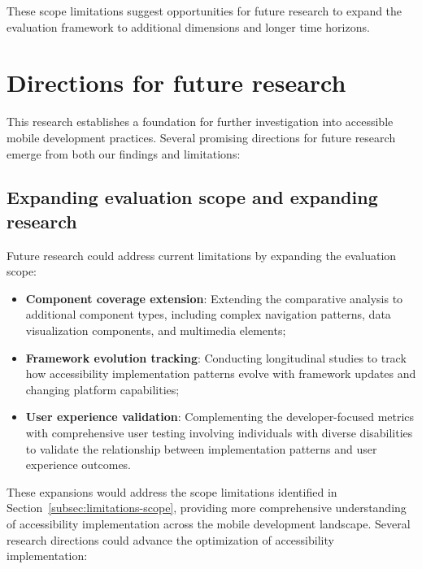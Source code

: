 These scope limitations suggest opportunities for future research to expand the evaluation framework to additional dimensions and longer time horizons.

\section{Directions for future research}
\label{sec:future-research}

This research establishes a foundation for further investigation into accessible mobile development practices. Several promising directions for future research emerge from both our findings and limitations:

\subsection{Expanding evaluation scope and expanding research}
\label{subsec:future-expand}

Future research could address current limitations by expanding the evaluation scope:

\begin{itemize}
    \item \textbf{Component coverage extension}: Extending the comparative analysis to additional component types, including complex navigation patterns, data visualization components, and multimedia elements;

    \item \textbf{Framework evolution tracking}: Conducting longitudinal studies to track how accessibility implementation patterns evolve with framework updates and changing platform capabilities;

    \item \textbf{User experience validation}: Complementing the developer-focused metrics with comprehensive user testing involving individuals with diverse disabilities to validate the relationship between implementation patterns and user experience outcomes.
\end{itemize}

These expansions would address the scope limitations identified in Section~\ref{subsec:limitations-scope}, providing more comprehensive understanding of accessibility implementation across the mobile development landscape. Several research directions could advance the optimization of accessibility implementation:

